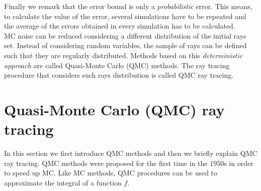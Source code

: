 Finally we remark that the error bound is only a \emph{probabilistic} error. This means, to calculate the value of the error, several simulations have to be repeated and the average of the errors obtained in every simulation has to be calculated. \\ \indent 
MC noise can be reduced considering a different distribution of the initial rays set.
Instead of considering random variables, the sample of rays can be defined such that they are regularly distributed. Methods based on this \textit{deterministic approach} are called Quasi-Monte Carlo (QMC) methods. The ray tracing procedure that considers such rays distribution is called QMC ray tracing.
\section{Quasi-Monte Carlo (QMC) ray tracing}\label{sec:QMC}
In this section we first introduce QMC methods and then we briefly explain QMC ray tracing. QMC methods were proposed for the first time in the 1950s in order to speed up MC. Like MC methods, QMC procedures can be used to approximate the integral of a function $f$.

